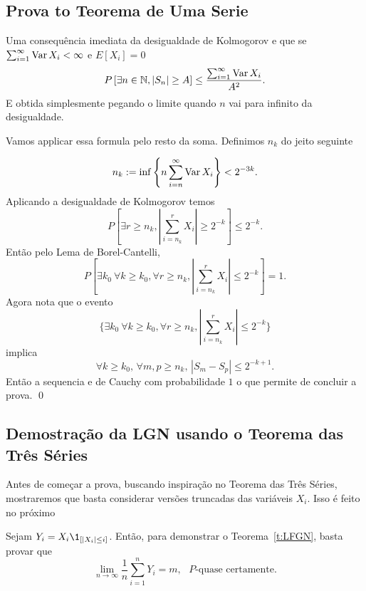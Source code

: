\begin{topics}
\subsection{Prova to Teorema de Uma Serie}

Uma consequência imediata da desigualdade de Kolmogorov e que se \\ $\sum_{i=1}^{\infty} \operatorname{Var} X_i<\infty$ e $E[X_i]=0$
$$P\left[ \exists n\in {\ensuremath{\mathbb N}},  |S_n| \ge A \right] \le \frac{\sum_{i=1}^{\infty} \operatorname{Var} X_i}{A^2}.$$
E obtida simplesmente pegando o limite quando $n$ vai para infinito da desigualdade.

\medskip

Vamos applicar essa formula pelo resto da soma. Definimos $n_k$ do jeito seguinte

\begin{equation}
 n_k:= \inf\left\{ n \sum_{i=n}^{\infty} \operatorname{Var} X_i \right\}<2^{-3k}.
\end{equation}
Aplicando a desigualdade de Kolmogorov temos
$$ P\left[ \exists r\ge n_k,  |\sum_{i=n_k}^r X_i| \ge 2^{-k} \right]\le 2^{-k}.$$
Então pelo Lema de Borel-Cantelli,
\begin{equation}
 P\left[ \exists k_0 \ \forall k\ge k_0, \forall r\ge n_k, \left|\sum_{i=n_k}^r X_i\right|\le 2^{-k} \right]=1.
\end{equation}
Agora nota que o evento  $$\{\exists k_0 \ \forall k\ge k_0, \forall r\ge n_k, |\sum_{i=n_k}^r X_i|\le 2^{-k}\}$$
implica  $$ \forall k\ge k_0,\, \forall m,p\ge n_k, \,
|S_m-S_p|\le 2^{-k+1}.$$
Então a sequencia e de Cauchy com probabilidade $1$ o que permite de concluir a prova. \qed




\subsection{Demostração da LGN usando o Teorema das Três Séries}

Antes de começar a prova, buscando inspiração no Teorema das Três Séries, mostraremos que basta considerar versões truncadas das variáveis $X_i$.
Isso é feito no próximo

\begin{lemma}
  \label{l:LFGN}
  Sejam $Y_i = X_i \1_{[|X_i| \leq i]}$.
  Então, para demonstrar o Teorema~\ref{t:LFGN}, basta provar que
  \begin{equation}
    \lim_{n \to \infty}\frac{1}{n} \sum_{i=1}^n Y_i = m, \text{ $P$-quase certamente.}
  \end{equation}
\end{lemma}


\end{topics}
